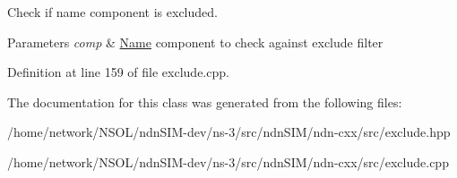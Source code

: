 Check if name component is excluded. 


\begin{DoxyParams}{Parameters}
{\em comp} & \hyperlink{classndn_1_1Name}{Name} component to check against exclude filter \\
\hline
\end{DoxyParams}


Definition at line 159 of file exclude.\+cpp.



The documentation for this class was generated from the following files\+:\begin{DoxyCompactItemize}
\item 
/home/network/\+N\+S\+O\+L/ndn\+S\+I\+M-\/dev/ns-\/3/src/ndn\+S\+I\+M/ndn-\/cxx/src/exclude.\+hpp\item 
/home/network/\+N\+S\+O\+L/ndn\+S\+I\+M-\/dev/ns-\/3/src/ndn\+S\+I\+M/ndn-\/cxx/src/exclude.\+cpp\end{DoxyCompactItemize}
